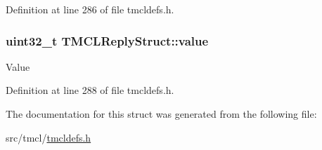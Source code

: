 Definition at line 286 of file tmcldefs.h.\hypertarget{structTMCLReplyStruct_aace5a128745c0f5b680a160b36cfaea6}{
\subsubsection[{value}]{\setlength{\rightskip}{0pt plus 5cm}uint32\_\-t {\bf TMCLReplyStruct::value}}}
\label{structTMCLReplyStruct_aace5a128745c0f5b680a160b36cfaea6}
Value 

Definition at line 288 of file tmcldefs.h.

The documentation for this struct was generated from the following file:\begin{DoxyCompactItemize}
\item 
src/tmcl/\hyperlink{tmcldefs_8h}{tmcldefs.h}\end{DoxyCompactItemize}
